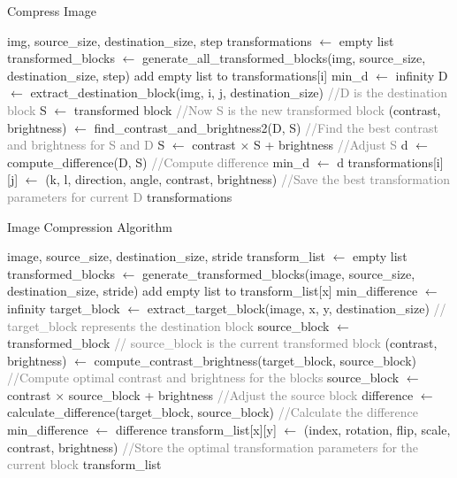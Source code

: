 \documentclass[a4paper,11pt, titlepage]{article}
\theoremstyle{definition}
\theoremstyle{plain}
\theoremstyle{remark}
\theoremstyle{definition}
\begin{document}
\begin{algorithm}
\caption{Compress Image}
\begin{algorithmic}[1]
\REQUIRE img, source\_size, destination\_size, step
\STATE transformations $\gets$ empty list
\STATE transformed\_blocks $\gets$ generate\_all\_transformed\_blocks(img, source\_size, destination\_size, step)
    \STATE add empty list to transformations[i]
    \STATE min\_d $\gets$ infinity
    \STATE D $\gets$ extract\_destination\_block(img, i, j, destination\_size) \textcolor{gray}{//D is the destination block}
        \STATE S $\gets$ transformed block \textcolor{gray}{//Now S is the new transformed block}
        \STATE (contrast, brightness) $\gets$ find\_contrast\_and\_brightness2(D, S) \textcolor{gray}{//Find the best contrast and brightness for S and D}
        \STATE S $\gets$ contrast $\times$ S + brightness \textcolor{gray}{//Adjust S}
        \STATE d $\gets$ compute\_difference(D, S) \textcolor{gray}{//Compute difference}
            \STATE min\_d $\gets$ d
            \STATE transformations[i][j] $\gets$ (k, l, direction, angle, contrast, brightness) \textcolor{gray}{//Save the best transformation parameters for current D}
        \ENDIF
    \ENDFOR
\ENDFOR
\RETURN transformations
\end{algorithmic}
\end{algorithm}
\begin{algorithm}
\caption{Image Compression Algorithm}
\begin{algorithmic}[1]
\REQUIRE image, source\_size, destination\_size, stride
\STATE transform\_list $\gets$ empty list
\STATE transformed\_blocks $\gets$ generate\_transformed\_blocks(image, source\_size, destination\_size, stride)
    \STATE add empty list to transform\_list[x]
    \STATE min\_difference $\gets$ infinity
    \STATE target\_block $\gets$ extract\_target\_block(image, x, y, destination\_size) \textcolor{gray}{// target\_block represents the destination block}
        \STATE source\_block $\gets$ transformed\_block \textcolor{gray}{// source\_block is the current transformed block}
        \STATE (contrast, brightness) $\gets$ compute\_contrast\_brightness(target\_block, source\_block) \textcolor{gray}{//Compute optimal contrast and brightness for the blocks}
        \STATE source\_block $\gets$ contrast $\times$ source\_block + brightness \textcolor{gray}{//Adjust the source block}
        \STATE difference $\gets$ calculate\_difference(target\_block, source\_block) \textcolor{gray}{//Calculate the difference}
            \STATE min\_difference $\gets$ difference
            \STATE transform\_list[x][y] $\gets$ (index, rotation, flip, scale, contrast, brightness) \textcolor{gray}{//Store the optimal transformation parameters for the current block}
        \ENDIF
    \ENDFOR
\ENDFOR
\RETURN transform\_list
\end{algorithmic}
\end{algorithm}
\end{document}
